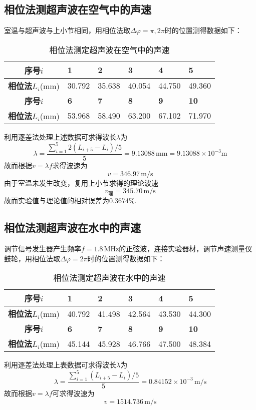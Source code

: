 \documentclass[UTF-8,twoside,cs4size]{ctexart}
\begin{document}
	\subsection{相位法测超声波在空气中的声速}
	室温与超声波与上小节相同，用相位法取$ \Delta\varphi=\pi,2\pi $时的位置测得数据如下：
	\begin{table}[!h]
		\centering
		\renewcommand\arraystretch{1.4}
		\captionsetup{skip=0pt}
		\caption{相位法测定超声波在空气中的声速}
		\begin{tabularx}{\textwidth}{|c|Y|Y|Y|Y|Y|}
			\hline
			\textbf{序号}$ i $&\textbf{1}&\textbf{2}&\textbf{3}&\textbf{4}&\textbf{5}\\
			\hline
			\textbf{相位法}$ L_i $(mm)&30.792&35.638&40.054&44.750&49.360\\
			\hline
			\textbf{序号}$ i $&\textbf{6}&\textbf{7}&\textbf{8}&\textbf{9}&\textbf{10}\\
			\hline
			\textbf{相位法}$ L_i $(mm)&53.968&58.490&63.200&67.102&71.970\\
			\hline
		\end{tabularx}
	\end{table}

	利用逐差法处理上述数据可求得波长$ \lambda $为
	\[\lambda=\frac{\sum_{i=1}^{5}2(L_{i+5}-L_i)/5}{5}=9.13088\,\mathrm{mm}=9.13088\times10^{-3}\mathrm m\]
	故而根据$ v=\lambda f $求得波速为
	\[v=346.97\,\mathrm{m/s}\]
	由于室温未发生改变，复用上小节求得的理论波速\[ v_{\text{理}}=345.70\,\mathrm{m/s} \]故而实验值与理论值的相对误差为0.3674\%.
	
	\subsection{相位法测超声波在水中的声速}
	调节信号发生器产生频率$ f=1.8\,\mathrm{MHz} $的正弦波，连接实验器材，调节声速测量仪鼓轮，用相位法取$ \Delta\varphi=2\pi $时的位置测得数据如下：
	\newpage
	\begin{table}[!h]
		\centering
		\renewcommand\arraystretch{1.4}
		\captionsetup{skip=0pt}
		\caption{相位法测定超声波在水中的声速}
		\begin{tabularx}{\textwidth}{|c|Y|Y|Y|Y|Y|}
			\hline
			\textbf{序号}$ i $&\textbf{1}&\textbf{2}&\textbf{3}&\textbf{4}&\textbf{5}\\
			\hline
			\textbf{相位法}$ L_i $(mm)&40.792&41.498&42.564&43.530&44.300\\
			\hline
			\textbf{序号}$ i $&\textbf{6}&\textbf{7}&\textbf{8}&\textbf{9}&\textbf{10}\\
			\hline
			\textbf{相位法}$ L_i $(mm)&45.144&45.928&46.766&47.500&48.384\\
			\hline
		\end{tabularx}
	\end{table}

	利用逐差法处理上表数据可求得波长$ \lambda $为
	\[\lambda=\frac{\sum_{i=1}^{5}(L_{i+5}-L_i)/5}{5}=0.84152\times10^{-3}\,\mathrm{m/s}\]
	故而根据$ v=\lambda f $可求得波速为
	\[v=1514.736\,\mathrm{m/s}\]
\end{document}
